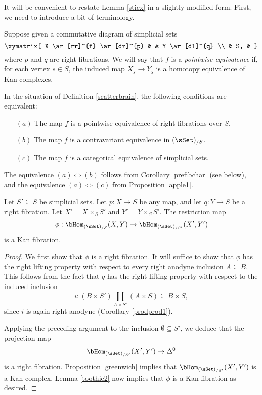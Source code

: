 It will be convenient to restate Lemma \ref{sticx} in a slightly modified form. First, we need to introduce a bit of terminology.

\begin{definition}\label{scatterbrain}
Suppose given a commutative diagram of simplicial sets
$$ \xymatrix{ X \ar[rr]^{f} \ar[dr]^{p} & & Y \ar[dl]^{q} \\
& S, & }$$
where $p$ and $q$ are right fibrations. We will say that $f$ is a
{\it pointwise equivalence} if, for each vertex $s \in S$, the induced map
$X_{s} \rightarrow Y_{s}$ is a homotopy equivalence of Kan complexes.
\end{definition}

\begin{remark}
In the situation of Definition \ref{scatterbrain}, the following conditions are equivalent:
\begin{itemize}
\item[$(a)$] The map $f$ is a pointwise equivalence of right fibrations over $S$.
\item[$(b)$] The map $f$ is a contravariant equivalence in $(\sSet)_{/S}$. 
\item[$(c)$] The map $f$ is a categorical equivalence of simplicial sets.
\end{itemize}
The equivalence $(a) \Leftrightarrow (b)$ follows from Corollary \ref{prefibchar}
(see below), and the equivalence $(a) \Leftrightarrow (c)$ from Proposition \ref{apple1}.
\end{remark}

\begin{lemma}\label{gottapruve2}
Let $S' \subseteq S$ be simplicial sets. Let
$p: X \rightarrow S$ be any map, and let $q: Y \rightarrow S$ be a right fibration.
Let $X' = X \times_{S} S'$ and $Y' = Y \times_{S} S'$. The restriction map
$$ \phi: \bHom_{ (\sSet)_{/S}} (X, Y) \rightarrow \bHom_{ (\sSet)_{/S'}}( X', Y')$$ is a Kan fibration.
\end{lemma}

\begin{proof}
We first show that $\phi$ is a right fibration. It will suffice to show that
$\phi$ has the right lifting property with respect to every right anodyne inclusion
$A \subseteq B$. This follows from the fact that $q$ has the right lifting property with respect
to the induced inclusion
$$i: (B \times S') \coprod_{ A \times S'} ( A \times S) \subseteq B \times S,$$
since $i$ is again right anodyne (Corollary \ref{prodprod1}). 

Applying the preceding argument to the inclusion $\emptyset \subseteq S'$, we deduce
that the projection map $$\bHom_{ (\sSet)_{/S'}}(X',Y') \rightarrow \Delta^0$$ is a right fibration.
Proposition \ref{greenwich} implies that $\bHom_{ (\sSet)_{/S'}}(X',Y')$ is a Kan complex.
Lemma \ref{toothie2} now implies that $\phi$ is a Kan fibration as desired.
\end{proof}

